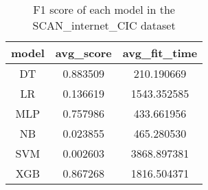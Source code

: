 \begin{table}[H]
\centering
\caption{F1 score of each model in the SCAN_internet_CIC dataset}
\label{f1_valid_scan_internet_cic}
\begin{tabular}{ccc}
\toprule
model &  avg\_score &  avg\_fit\_time \\
\midrule
   DT &   0.883509 &    210.190669 \\
   LR &   0.136619 &   1543.352585 \\
  MLP &   0.757986 &    433.661956 \\
   NB &   0.023855 &    465.280530 \\
  SVM &   0.002603 &   3868.897381 \\
  XGB &   0.867268 &   1816.504371 \\
\bottomrule
\end{tabular}
\end{table}
